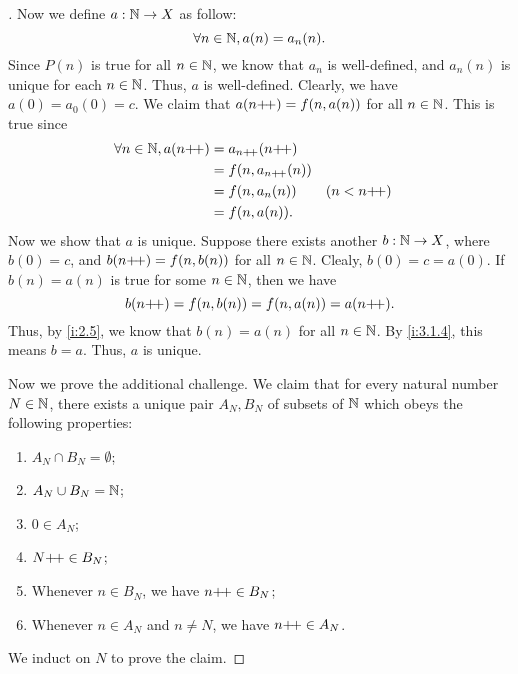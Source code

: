 \begin{proof}[]
  Now we define \(a : \mathbb{N} \to X\) as follow:
  \[
    \forall n \in \mathbb{N}, a(n) = a_n(n).
  \]
  Since \(P(n)\) is true for all \(n \in \mathbb{N}\), we know that \(a_n\) is well-defined, and \(a_n(n)\) is unique for each \(n \in \mathbb{N}\).
  Thus, \(a\) is well-defined.
  Clearly, we have \(a(0) = a_0(0) = c\).
  We claim that \(a(n{+}\!{+}) = f(n, a(n))\) for all \(n \in \mathbb{N}\).
  This is true since
  \begin{align*}
    \forall n \in \mathbb{N}, a(n{+}\!{+}) & = a_{n{+}\!{+}}(n{+}\!{+})                    \\
                              & = f(n, a_{n{+}\!{+}}(n))                 \\
                              & = f(n, a_n(n))      &  & (n < n{+}\!{+}) \\
                              & = f(n, a(n)).
  \end{align*}
  Now we show that \(a\) is unique.
  Suppose there exists another \(b : \mathbb{N} \to X\), where \(b(0) = c\), and \(b(n{+}\!{+}) = f(n, b(n))\) for all \(n \in \mathbb{N}\).
  Clealy, \(b(0) = c = a(0)\).
  If \(b(n) = a(n)\) is true for some \(n \in \mathbb{N}\), then we have
  \[
    b(n{+}\!{+}) = f(n, b(n)) = f(n, a(n)) = a(n{+}\!{+}).
  \]
  Thus, by \cref{i:2.5}, we know that \(b(n) = a(n)\) for all \(n \in \mathbb{N}\).
  By \cref{i:3.1.4}, this means \(b = a\).
  Thus, \(a\) is unique.

  Now we prove the additional challenge.
  We claim that for every natural number \(N \in \mathbb{N}\), there exists a unique pair \(A_N, B_N\) of subsets of \(\mathbb{N}\) which obeys the following properties:
  \begin{enumerate}
    \item \(A_N \cap B_N = \emptyset\);
    \item \(A_N \cup B_N = \mathbb{N}\);
    \item \(0 \in A_N\);
    \item \(N{+}\!{+} \in B_N\);
    \item Whenever \(n \in B_N\), we have \(n{+}\!{+} \in B_N\);
    \item Whenever \(n \in A_N\) and \(n \neq N\), we have \(n{+}\!{+} \in A_N\).
  \end{enumerate}
  We induct on \(N\) to prove the claim.


\end{proof}
